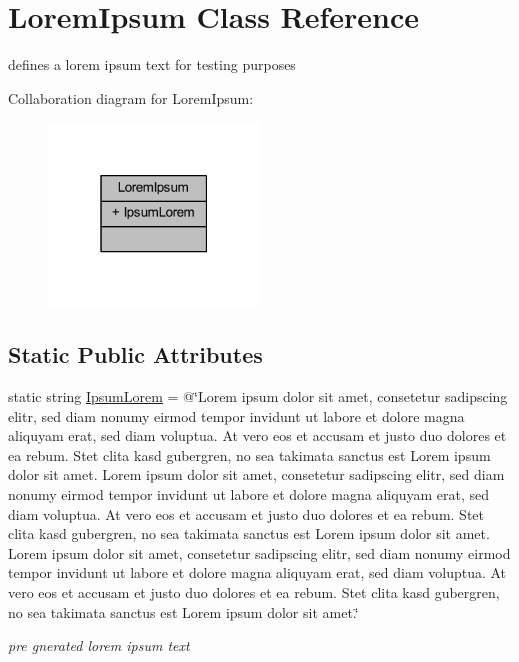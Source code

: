 \hypertarget{class_lorem_ipsum}{}\section{Lorem\+Ipsum Class Reference}
\label{class_lorem_ipsum}


defines a lorem ipsum text for testing purposes  




Collaboration diagram for Lorem\+Ipsum\+:\nopagebreak
\begin{figure}[H]
\begin{center}
\leavevmode
\includegraphics[width=159pt]{class_lorem_ipsum__coll__graph}
\end{center}
\end{figure}
\subsection*{Static Public Attributes}
\begin{DoxyCompactItemize}
\item 
static string \mbox{\hyperlink{class_lorem_ipsum_a1a11ef50e3a5b94928207b15b4ce6fa6}{Ipsum\+Lorem}} = @\char`\"{}Lorem ipsum dolor sit amet, consetetur sadipscing elitr, sed diam nonumy eirmod tempor invidunt ut labore et dolore magna aliquyam erat, sed diam voluptua. At vero eos et accusam et justo duo dolores et ea rebum. Stet clita kasd gubergren, no sea takimata sanctus est Lorem ipsum dolor sit amet. Lorem ipsum dolor sit amet, consetetur sadipscing elitr, sed diam nonumy eirmod tempor invidunt ut labore et dolore magna aliquyam erat, sed diam voluptua. At vero eos et accusam et justo duo dolores et ea rebum. Stet clita kasd gubergren, no sea takimata sanctus est Lorem ipsum dolor sit amet. Lorem ipsum dolor sit amet, consetetur sadipscing elitr, sed diam nonumy eirmod tempor invidunt ut labore et dolore magna aliquyam erat, sed diam voluptua. At vero eos et accusam et justo duo dolores et ea rebum. Stet clita kasd gubergren, no sea takimata sanctus est Lorem ipsum dolor sit amet.\char`\"{}
\begin{DoxyCompactList}\small\item\em pre gnerated lorem ipsum text \end{DoxyCompactList}\end{DoxyCompactItemize}


